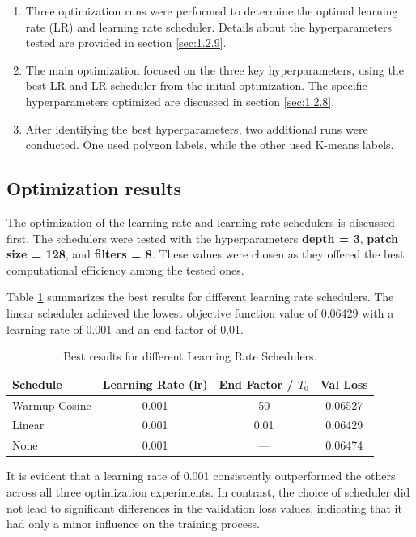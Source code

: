 \begin{enumerate}
    \item Three optimization runs were performed to determine the optimal learning rate (LR) and learning rate scheduler. Details about the hyperparameters tested are provided in section \ref{sec:1.2.9}.
    \item The main optimization focused on the three key hyperparameters, using the best LR and LR scheduler from the initial optimization. The specific hyperparameters optimized are discussed in section \ref{sec:1.2.8}.
    \item After identifying the best hyperparameters, two additional runs were conducted. One used polygon labels, while the other used K-means labels.
\end{enumerate}
\subsection{Optimization results}

The optimization of the learning rate and learning rate schedulers is discussed first. The schedulers were tested with the hyperparameters \textbf{depth = 3}, \textbf{patch size = 128}, and \textbf{filters = 8}. These values were chosen as they offered the best computational efficiency among the tested ones. 

Table \ref{tab:scheduler_results} summarizes the best results for different learning rate schedulers. The linear scheduler achieved the lowest objective function value of 0.06429 with a learning rate of 0.001 and an end factor of 0.01. 

\begin{table}[H]
    \centering
    \caption{Best results for different Learning Rate Schedulers.}
    \begin{tabular}{lccc}
        \toprule
        Schedule & Learning Rate (lr) & End Factor / \( T_0 \) & Val Loss \\
        \midrule
        Warmup Cosine & 0.001 & 50 & 0.06527 \\
        Linear & 0.001 & 0.01 & 0.06429 \\
        None & 0.001 & --- &  0.06474 \\
        \bottomrule
    \end{tabular}
    \label{tab:scheduler_results}
\end{table}

It is evident that a learning rate of 0.001 consistently outperformed the others across all three optimization experiments. In contrast, the choice of scheduler did not lead to significant differences in the validation loss values, indicating that it had only a minor influence on the training process.

